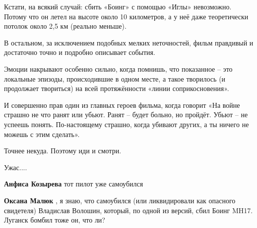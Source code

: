 \begin{itemize}
Кстати, на всякий случай: сбить «Боинг» с помощью «Иглы» невозможно. Потому что
он летел на высоте около 10 километров, а у неё даже теоретически потолок около
2,5 км (реально меньше).

В остальном, за исключением подобных мелких неточностей, фильм правдивый и
достаточно точно и подробно описывает события.

Эмоции накрывают особенно сильно, когда помнишь, что показанное – это локальные
эпизоды, происходившие в одном месте, а такое творилось (и продолжает
твориться) на всей протяжённости «линии соприкосновения».

И совершенно прав один из главных героев фильма, когда говорит «На войне
страшно не что ранят или убьют. Ранят – будет больно, но пройдёт. Убьют – не
успеешь понять. По-настоящему страшно, когда убивают других, а ты ничего не
можешь с этим сделать».

Точнее некуда. Поэтому иди и смотри.

\begin{itemize}
 
Ужас....

 
\textbf{Анфиса Козырева} тот пилот уже самоубился

 
\textbf{Оксана Малюк} , я знаю, что самоубился (или ликвидировали как опасного свидетеля) Владислав Волошин, который, по одной из версий, сбил Боинг MH17. Луганск бомбил тоже он, что ли?

 

\end{itemize}
\end{itemize}
